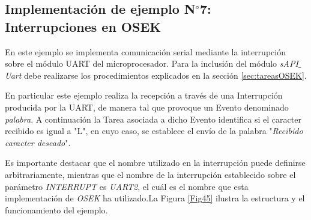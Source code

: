 \documentclass[12pt,letterpaper]{article}
\begin{document}
\subsection{Implementación de ejemplo N$^{\circ}$7: Interrupciones en OSEK}

En este ejemplo se implementa comunicación serial mediante la interrupción sobre el módulo UART del microprocesador. Para la inclusión del módulo \textit{sAPI$\_$Uart} debe realizarse los procedimientos explicados en la sección \ref{sec:tareasOSEK}. 

En particular este ejemplo realiza la recepción a través de una Interrupción producida por la UART, de manera tal que provoque un Evento denominado \textit{palabra}. A continuación la Tarea asociada a dicho Evento identifica si el caracter recibido es igual a "L", en cuyo caso, se establece el envío de la palabra "\textit{Recibido caracter deseado}".

Es importante destacar que el nombre utilizado en la interrupción puede definirse arbitrariamente, mientras que el nombre de la interrupción establecido sobre el parámetro \textit{INTERRUPT} es \textit{UART2}, el cuál es el nombre que esta implementación de \textit{OSEK} ha utilizado.La Figura \ref{Fig45} ilustra la estructura y el funcionamiento del ejemplo.
\end{document}
